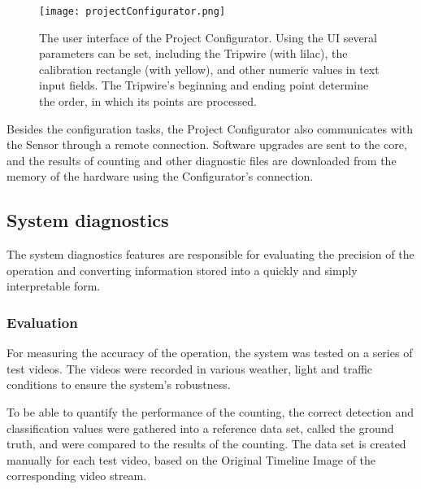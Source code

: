 \begin{figure}[!h]
	\centering
	\texttt{[image: projectConfigurator.png]}
	\caption{The user interface of the Project Configurator. Using the UI several parameters can be set, including the Tripwire (with lilac), the calibration rectangle (with yellow), and other numeric values in text input fields. The Tripwire's beginning and ending point determine the order, in which its points are processed. \label{fig:project_configurator}}
\end{figure}

Besides the configuration tasks, the Project Configurator also communicates with the Sensor through a remote connection.
Software upgrades are sent to the core, and the results of counting and other diagnostic files are downloaded from the memory of the hardware using the Configurator's connection.
\subsection{System diagnostics}
The system diagnostics features are responsible for evaluating the precision of the operation and converting information stored into a quickly and simply interpretable form.

\subsubsection{Evaluation}
For measuring the accuracy of the operation, the system was tested on a series of test videos.
The videos were recorded in various weather, light and traffic conditions to ensure the system's robustness.

To be able to quantify the performance of the counting, the correct detection and classification values were gathered into a reference data set, called the ground truth, and were compared to the results of the counting.
The data set is created manually for each test video, based on the Original Timeline Image of the corresponding video stream.

